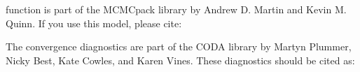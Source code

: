function is part of the MCMCpack library by Andrew D.
Martin and Kevin M. Quinn. If you use this model, please cite:
\begin{verse}
\end{verse}
The convergence diagnostics are part of the CODA library
by Martyn Plummer, Nicky Best, Kate Cowles, and Karen Vines. These diagnostics
should be cited as: 
\begin{verse}
\end{verse}
